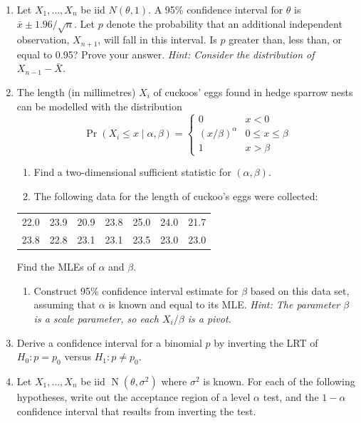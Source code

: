 \documentclass[
]{book}
\providecommand{\tightlist}{%
  \setlength{\itemsep}{0pt}\setlength{\parskip}{0pt}}
\DeclareMathOperator{\N}{N}
\theoremstyle{definition}
\theoremstyle{definition}
\theoremstyle{definition}
\theoremstyle{definition}
\theoremstyle{remark}
\begin{document}
\begin{enumerate}
\def\labelenumi{\arabic{enumi}.}
\item
  Let \(X_1,\dots,X_n\) be iid \(N(\theta,1)\). A 95\% confidence interval for \(\theta\) is \(\bar x\pm 1.96/\sqrt n\). Let \(p\) denote the probability that an additional independent observation, \(X_{n+1}\), will fall in this interval. Is \(p\) greater than, less than, or equal to 0.95? Prove your answer. \textit{Hint: Consider the distribution of $X_{n-1}-\bar X$.}
\item
  The length (in millimetres) \(X_i\) of cuckoos' eggs found in hedge sparrow nests can be modelled with the distribution\[\Pr(X_i\leq x\mid \alpha,\beta) = \begin{cases}0 &x <0 \\(x/\beta)^\alpha &0\leq x \leq \beta \\1&x > \beta\end{cases}\]

  \begin{enumerate}
  \def\labelenumii{(\alph{enumii})}
  \item
    Find a two-dimensional sufficient statistic for \((\alpha,\beta)\).
  \item
    The following data for the length of cuckoo's eggs were collected:
  \end{enumerate}

  \begin{longtable}[]{@{}lllllll@{}}
  \toprule
  \endhead
  22.0 & 23.9 & 20.9 & 23.8 & 25.0 & 24.0 & 21.7 \\
  23.8 & 22.8 & 23.1 & 23.1 & 23.5 & 23.0 & 23.0 \\
  \bottomrule
  \end{longtable}

  Find the MLEs of \(\alpha\) and \(\beta\).

  \begin{enumerate}
  \def\labelenumii{(\alph{enumii})}
  \setcounter{enumii}{2}
  \tightlist
  \item
    Construct 95\% confidence interval estimate for \(\beta\) based on this data set, assuming that \(\alpha\) is known and equal to its MLE. \emph{Hint: The parameter \(\beta\) is a scale parameter, so each \(X_i/\beta\) is a pivot.}
  \end{enumerate}
\item
  Derive a confidence interval for a binomial \(p\) by inverting the LRT of \(H_0:p=p_0\) versus \(H_1:p\neq p_0\).
\item
  Let \(X_1,\dots,X_n\) be iid \(\N(\theta,\sigma^2)\) where \(\sigma^2\) is known. For each of the following hypotheses, write out the acceptance region of a level \(\alpha\) test, and the \(1-\alpha\) confidence interval that results from inverting the test.


\end{enumerate}
\end{document}
